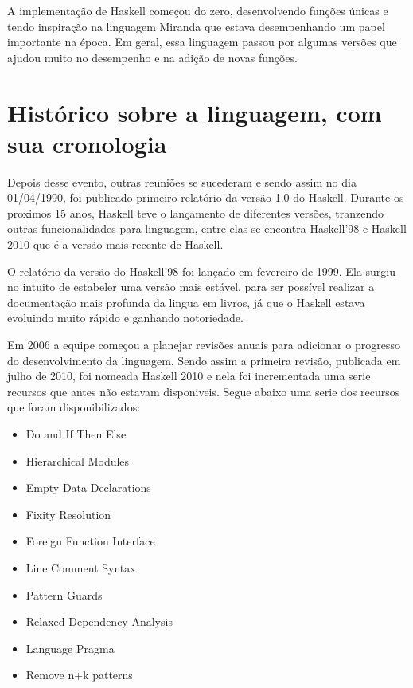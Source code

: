 \documentclass[
  12pt,				         %
  oneside,			       %
  a4paper,			       %
  english,		       	 %
  brazil,			      	 %
]{abntex2}
\begin{document}
    A implementação de Haskell começou do zero, desenvolvendo funções únicas e tendo inspiração na linguagem Miranda que estava desempenhando um papel 
    importante na época. Em geral, essa linguagem passou por algumas versões que ajudou muito no desempenho e na adição de novas funções. 

    \newpage
    \chapter{Histórico sobre a linguagem, com sua cronologia}

    Depois desse evento, outras reuniões se sucederam e sendo assim no dia 01/04/1990, foi publicado primeiro relatório
    da versão 1.0 do Haskell. Durante os proximos 15 anos, Haskell teve o lançamento de diferentes versões, tranzendo outras
    funcionalidades para linguagem, entre elas se encontra Haskell'98 e Haskell 2010 que é a versão mais recente de Haskell.  

    O relatório da versão do Haskell'98 foi lançado em fevereiro de 1999. Ela surgiu no intuito de estabeler uma versão mais estável, 
    para ser possível realizar a documentação mais profunda da lingua em livros, já que o Haskell estava evoluindo muito rápido e ganhando 
    notoriedade.

    Em 2006 a equipe começou a planejar revisões anuais para adicionar o progresso do desenvolvimento da linguagem. Sendo assim a primeira revisão,
    publicada em julho de 2010, foi nomeada Haskell 2010 e nela foi incrementada uma serie recursos que antes não estavam disponiveis.
    Segue abaixo uma serie dos recursos que foram disponibilizados:
    
    \begin{itemize}
      \item Do and If Then Else 
      \item Hierarchical Modules
      \item Empty Data Declarations
      \item Fixity Resolution 
      \item Foreign Function Interface
      \item Line Comment Syntax
      \item Pattern Guards
      \item Relaxed Dependency Analysis
      \item Language Pragma
      \item Remove n+k patterns
    \end{itemize}
\end{document}
